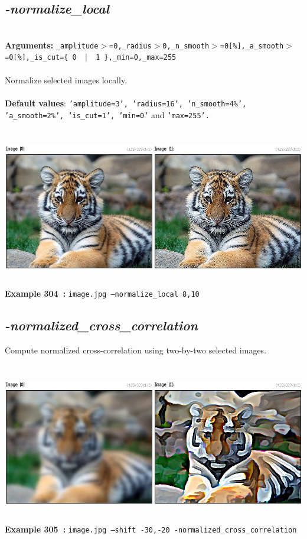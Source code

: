 \documentclass[a4paper,11pt,twoside]{book}
\begin{document}
\subsection{\emph{-normalize\_local} }\vspace*{-0.5em}
~\\\textbf{Arguments: } 
{\small \texttt{\_amplitude$>$=0,\_radius$>$0,\_n\_smooth$>$=0[\%],\_a\_smooth$>$=0[\%],\_is\_cut=\{ 0 ~$|$~ 1 \},\_min=0,\_max=255}}\\~\\
Normalize selected images locally.
~\\~\\\textbf{Default values}: {\small \texttt{'amplitude=3', 'radius=16', 'n\_smooth=4\%', 'a\_smooth=2\%', 'is\_cut=1', 'min=0'} and \texttt{'max=255'.}}
\begin{center}\includegraphics[keepaspectratio=true,height=7cm,width=\textwidth]{img/gmic_def304.jpg}\\
{\footnotesize \textbf{Example 304~:} \texttt{image.jpg --normalize\_local 8,10}}
\end{center}

\subsection{\emph{-normalized\_cross\_correlation} }\vspace*{-0.5em}
Compute normalized cross-correlation using two-by-two selected images.
\begin{center}\includegraphics[keepaspectratio=true,height=7cm,width=\textwidth]{img/gmic_def305.jpg}\\
{\footnotesize \textbf{Example 305~:} \texttt{image.jpg --shift -30,-20 -normalized\_cross\_correlation}}
\end{center}
\end{document}
